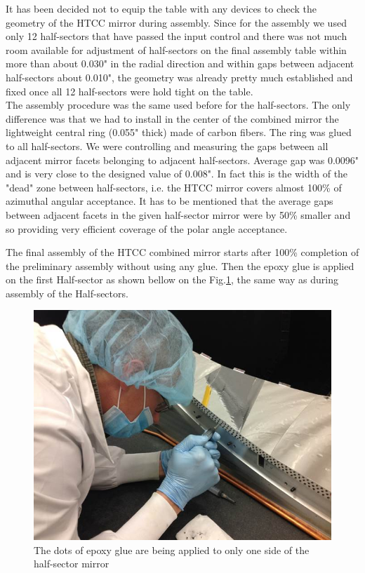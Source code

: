 \indent It has been decided not to equip the table with any devices to check the geometry of the HTCC mirror during assembly. Since for the assembly we used only 12 half-sectors that have passed the input control and there was not much room available for adjustment of half-sectors on the final assembly table within more than about 0.030" in the radial direction and within gaps between adjacent half-sectors about 0.010", the geometry was already pretty much established and fixed once all 12 half-sectors were hold tight on the table.
\\
\indent The assembly procedure was the same used before for the half-sectors. The only difference was that we had to install in the center of the combined mirror the lightweight central ring (0.055" thick) made of carbon fibers. The ring was glued to all half-sectors. We were controlling and measuring the gaps between all adjacent mirror facets belonging to adjacent half-sectors. Average gap was 0.0096" and is very close to the designed value of 0.008". In fact this is the width of the "dead" zone between half-sectors, i.e. the HTCC mirror covers almost 100\% of azimuthal angular acceptance. It has to be mentioned that the average gaps between adjacent facets in the given half-sector mirror were by 50\% smaller and so providing very efficient coverage of the polar angle acceptance. 

The final assembly of the HTCC combined mirror starts after 100\% completion of the preliminary assembly without using any glue. Then the epoxy glue is applied on the first Half-sector as shown bellow on the Fig.\ref{fig:Ap_Gl_Half_Sect}, the same way as during assembly of the Half-sectors.
 
\begin{figure}[h]
    \centering
    \includegraphics[width=1.0\linewidth]{images/Ap_Gl_Half_Sect.jpg}
    \caption{The dots of epoxy glue are being applied to only one side of the half-sector mirror}
    \label{fig:Ap_Gl_Half_Sect}
\end{figure}
 
